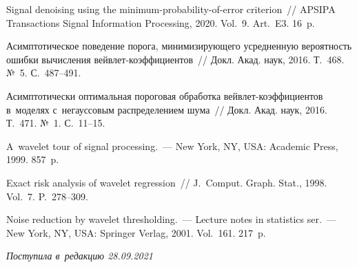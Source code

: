 \begin{multicols}{2}
{{\begin{thebibliography}{9}
Signal denoising using the minimum-probability-of-error criterion~// APSIPA Transactions 
Signal Information Processing, 2020. Vol.~9. Art.~E3. 16~p.

 Асимптотическое поведение порога, ми\-ни\-ми\-зи\-ру\-юще\-го 
усред\-нен\-ную ве\-ро\-ят\-ность ошиб\-ки вы\-чис\-ле\-ния 
вейв\-лет-ко\-эф\-фи\-ци\-ен\-тов~// Докл. Акад. наук, 2016. 
Т.~468. №~5. С.~487--491.

 Асимп\-то\-ти\-че\-ски оптимальная пороговая обработка 
вейв\-лет-ко\-эф\-фи\-ци\-ен\-тов в~моделях с~негауссовым рас\-пре\-де\-ле\-ни\-ем шума~// Докл. Акад. наук, 
2016. Т.~471. №~1. С.~11--15.

 A~wavelet tour of signal processing.~--- New York, NY, USA: Academic Press, 1999. 857~p.

Exact risk analysis of wavelet regression~// J.~Comput. Graph. Stat., 1998. Vol.~7. P.~278--309.

Noise reduction by wavelet thresholding.~--- Lecture notes in statistics ser.~--- 
 New York, NY, USA: Springer Verlag, 2001. Vol.~161. 217~p.
 
  \end{thebibliography}

}
}


\end{multicols}

\vspace*{-9pt}

\hfill{\small\textit{Поступила в~редакцию 28.09.2021}}



\newpage

\vspace*{-28pt}





\def\tit{MINIMAX ESTIMATES OF~THE~LOSS FUNCTION\\ BASED ON~INTEGRAL ERROR PROBABILITIES\\ 
DURING THRESHOLD PROCESSING OF~WAVELET COEFFICIENTS}


